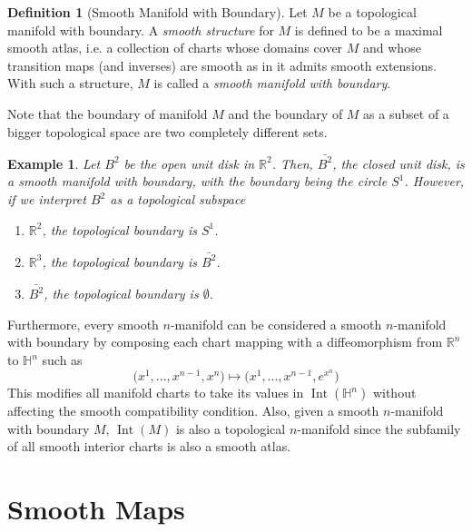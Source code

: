 \documentclass{article}
\DeclareMathOperator{\Int}{Int}
\newtheorem{example}{Example}[section]
\theoremstyle{remark}
\theoremstyle{definition}
\newtheorem{definition}{Definition}[section]
\begin{document}
\begin{definition}[Smooth Manifold with Boundary]
Let $M$ be a topological manifold with boundary. A \textit{smooth structure} for $M$ is defined to be a maximal smooth atlas, i.e. a collection of charts whose domains cover $M$ and whose transition maps (and inverses) are smooth as in it admits smooth extensions. With such a structure, $M$ is called a \textit{smooth manifold with boundary}. 
\end{definition}


Note that the boundary of manifold $M$ and the boundary of $M$ as a subset of a bigger topological space are two completely different sets. 

\begin{example}
Let $B^2$ be the open unit disk in $\mathbb{R}^2$. Then, $\bar{B^2}$, the closed unit disk, is a smooth manifold with boundary, with the boundary being the circle $S^1$. However, if we interpret $B^2$ as a topological subspace 
\begin{enumerate}
    \item $\mathbb{R}^2$, the topological boundary is $S^1$. 
    \item $\mathbb{R}^3$, the topological boundary is $\bar{B^2}$. 
    \item $\bar{B^2}$, the topological boundary is $\emptyset$. 
\end{enumerate}
\end{example}

Furthermore, every smooth $n$-manifold can be considered a smooth $n$-manifold with boundary by composing each chart mapping with a diffeomorphism from $\mathbb{R}^n$ to $\mathbb{H}^n$ such as
\[\big(x^1, ..., x^{n-1}, x^n \big) \mapsto \big( x^1, ..., x^{n-1}, e^{x^n} \big)\]
This modifies all manifold charts to take its values in $\Int(\mathbb{H}^n)$ without affecting the smooth compatibility condition. 
Also, given a smooth $n$-manifold with boundary $M$, $\Int(M)$ is also a topological $n$-manifold since the subfamily of all smooth interior charts is also a smooth atlas. 

\section{Smooth Maps}
\end{document}
